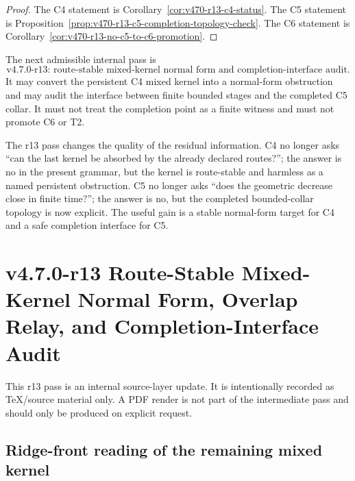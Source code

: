 \begin{proof}
The C4 statement is Corollary~\ref{cor:v470-r13-c4-status}.  The C5 statement is
Proposition~\ref{prop:v470-r13-c5-completion-topology-check}.  The C6 statement
is Corollary~\ref{cor:v470-r13-no-c5-to-c6-promotion}.
\end{proof}

\begin{corollary}
\label{cor:v470-r13-permitted-r13-direction}
The next admissible internal pass is
\[
\text{v4.7.0-r13: route-stable mixed-kernel normal form and completion-interface audit.}
\]
It may convert the persistent C4 mixed kernel into a normal-form obstruction and
may audit the interface between finite bounded stages and the completed C5
collar.  It must not treat the completion point as a finite witness and must not
promote C6 or T2.
\end{corollary}

\begin{remark}[r13 summary]
The r13 pass changes the quality of the residual information.  C4 no longer asks
``can the last kernel be absorbed by the already declared routes?''; the answer is
no in the present grammar, but the kernel is route-stable and harmless as a named
persistent obstruction.  C5 no longer asks ``does the geometric decrease close in
finite time?''; the answer is no, but the completed bounded-collar topology is
now explicit.  The useful gain is a stable normal-form target for C4 and a safe
completion interface for C5.
\end{remark}




\section{v4.7.0-r13 Route-Stable Mixed-Kernel Normal Form, Overlap Relay, and Completion-Interface Audit}
\label{sec:v470-r13-route-stable-mixed-kernel-normal-form-overlap-relay}

\begin{remark}
This r13 pass is an internal source-layer update.  It is intentionally recorded as
TeX/source material only.  A PDF render is not part of the intermediate pass and
should only be produced on explicit request.
\end{remark}

\subsection{Ridge-front reading of the remaining mixed kernel}
\label{subsec:v470-r13-ridge-front-reading}

